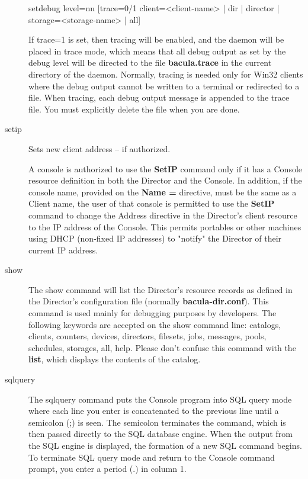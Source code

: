 \begin{description}
setdebug level=nn [trace=0/1 client={\textless}client-name{\textgreater} | dir | director |
  storage={\textless}storage-name{\textgreater} | all]

   If trace=1 is set, then tracing will be enabled, and the daemon will be
   placed in trace mode, which means that all debug output as set by the
   debug level will be directed to the file {\bf bacula.trace} in the
   current directory of the daemon.  Normally, tracing is needed only for
   Win32 clients where the debug output cannot be written to a terminal or
   redirected to a file.  When tracing, each debug output message is
   appended to the trace file.  You must explicitly delete the file when
   you are done.

\item [setip]
   Sets new client address -- if authorized.

   A console is authorized to use the {\bf SetIP} command only if it has a
   Console resource definition in both the Director and the Console.  In
   addition, if the console name, provided on the {\bf Name =} directive,
   must be the same as a Client name, the user of that console is permitted
   to use the {\bf SetIP} command to change the Address directive in the
   Director's client resource to the IP address of the Console.  This
   permits portables or other machines using DHCP (non-fixed IP addresses)
   to "notify" the Director of their current IP address.



\item [show]
   The show command will list the Director's resource records as defined in
   the Director's configuration file (normally {\bf bacula-dir.conf}).
   This command is used mainly for debugging purposes by developers.
   The following keywords are accepted on the
   show command line: catalogs, clients, counters, devices, directors,
   filesets, jobs, messages, pools, schedules, storages, all, help.
   Please don't confuse this command
   with the {\bf list}, which displays the contents of the catalog.

\item [sqlquery]
   The sqlquery command puts the Console program into SQL query mode where
   each line you enter is concatenated to the previous line until a
   semicolon (;) is seen.  The semicolon terminates the command, which is
   then passed directly to the SQL database engine.  When the output from
   the SQL engine is displayed, the formation of a new SQL command begins.
   To terminate SQL query mode and return to the Console command prompt,
   you enter a period (.) in column 1.


\end{description}
